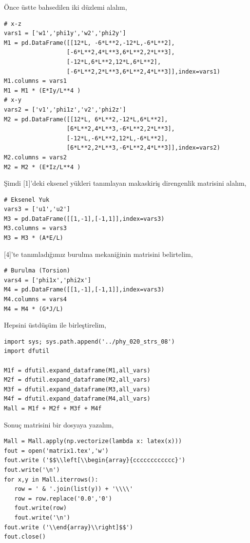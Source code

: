 \documentclass[12pt,fleqn]{article}\usepackage{../../common}
\begin{document}
Önce üstte bahsedilen iki düzlemi alalım,

\begin{verbatim}
# x-z
vars1 = ['w1','phi1y','w2','phi2y']
M1 = pd.DataFrame([[12*L, -6*L**2,-12*L,-6*L**2],
                  [-6*L**2,4*L**3,6*L**2,2*L**3],
                  [-12*L,6*L**2,12*L,6*L**2],
                  [-6*L**2,2*L**3,6*L**2,4*L**3]],index=vars1)
M1.columns = vars1
M1 = M1 * (E*Iy/L**4 )
# x-y
vars2 = ['v1','phi1z','v2','phi2z']
M2 = pd.DataFrame([[12*L, 6*L**2,-12*L,6*L**2],
                  [6*L**2,4*L**3,-6*L**2,2*L**3],
                  [-12*L,-6*L**2,12*L,-6*L**2],
                  [6*L**2,2*L**3,-6*L**2,4*L**3]],index=vars2)
M2.columns = vars2
M2 = M2 * (E*Iz/L**4 )
\end{verbatim}

Şimdi [1]'deki eksenel yükleri tanımlayan makaskiriş direngenlik matrisini
alalım,

\begin{verbatim}
# Eksenel Yuk
vars3 = ['u1','u2']
M3 = pd.DataFrame([[1,-1],[-1,1]],index=vars3)
M3.columns = vars3
M3 = M3 * (A*E/L)
\end{verbatim}

[4]'te tanımladığımız burulma mekaniğinin matrisini belirtelim,

\begin{verbatim}
# Burulma (Torsion)
vars4 = ['phi1x','phi2x']
M4 = pd.DataFrame([[1,-1],[-1,1]],index=vars3)
M4.columns = vars4
M4 = M4 * (G*J/L)
\end{verbatim}

Hepsini üstdüşüm ile birleştirelim,

\begin{verbatim}
import sys; sys.path.append('../phy_020_strs_08')
import dfutil

M1f = dfutil.expand_dataframe(M1,all_vars)
M2f = dfutil.expand_dataframe(M2,all_vars)
M3f = dfutil.expand_dataframe(M3,all_vars)
M4f = dfutil.expand_dataframe(M4,all_vars)
Mall = M1f + M2f + M3f + M4f
\end{verbatim}

Sonuç matrisini bir dosyaya yazalım, 

\begin{verbatim}
Mall = Mall.apply(np.vectorize(lambda x: latex(x)))
fout = open('matrix1.tex','w')
fout.write ('$$\\left[\\begin{array}{cccccccccccc}')
fout.write('\n')
for x,y in Mall.iterrows():
   row = ' & '.join(list(y)) + '\\\\'
   row = row.replace('0.0','0')
   fout.write(row)
   fout.write('\n')
fout.write ('\\end{array}\\right]$$')
fout.close()
\end{verbatim}
\end{document}
